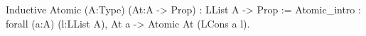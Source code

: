 Inductive Atomic (A:Type) (At:A -> Prop) : LList A -> Prop :=
 Atomic_intro : forall (a:A) (l:LList A), At a -> 
                       Atomic At (LCons a l).